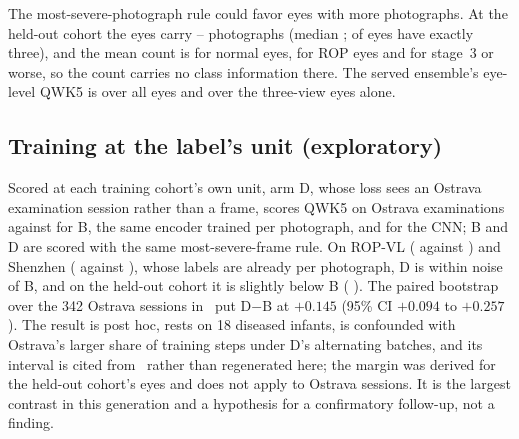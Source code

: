 \documentclass[journal]{IEEEtran}
\begin{document}
The most-severe-photograph rule could favor eyes with more photographs. At the held-out cohort the eyes carry \devPhotosPerEyeMin{}--\devPhotosPerEyeMax{} photographs (median \devPhotosPerEyeMedian{}; \devEyesThreeViews{} of \devEyes{} eyes have exactly three), and the mean count is \devPhotosNormalMean{} for normal eyes, \devPhotosDiseasedMean{} for ROP eyes and \devPhotosSevereMean{} for stage~3 or worse, so the count carries no class information there. The served ensemble's eye-level QWK5 is \BdevQens{} \BdevQensci{} over all eyes and \BdevQthree{} \BdevQthreeci{} over the three-view eyes alone.

\begin{table}[!t]
\caption{Operating point and calibration, per arm and seed. Threshold: the largest any-ROP score keeping cross-validation (CV) unit-level sensitivity $\ge 0.90$; carried unchanged to the held-out cohort's development half (dev), where sensitivity and specificity are means over the seed's five fold models. Severe: stage \nSevereFrom{} or worse, including AP-ROP. $T$: temperature fitted on CV out-of-fold unit vectors. ECE: expected calibration error, ten bins, dev eyes, seeds pooled, as trained and after $T$.}
\label{tab:operating}
\centering\scriptsize\setlength{\tabcolsep}{2.4pt}

\end{table}

\subsection{Training at the label's unit (exploratory)}
Scored at each training cohort's own unit, arm D, whose loss sees an Ostrava examination session rather than a frame, scores QWK5 \DostravaQ{} \DostravaQci{} on Ostrava examinations against \BostravaQ{} \BostravaQci{} for B, the same encoder trained per photograph, and \CostravaQ{} \CostravaQci{} for the CNN; B and D are scored with the same most-severe-frame rule. On ROP-VL (\DropvlQ{} against \BropvlQ{}) and Shenzhen (\DshenzhenQ{} against \BshenzhenQ{}), whose labels are already per photograph, D is within noise of B, and on the held-out cohort it is slightly below B (\devDiffDB{} \devDiffDBci{}). The paired bootstrap over the 342 Ostrava sessions in~\cite{nagpure2026} put D$-$B at $+0.145$ (95\% CI $+0.094$ to $+0.257$). The result is post hoc, rests on 18 diseased infants, is confounded with Ostrava's larger share of training steps under D's alternating batches, and its interval is cited from~\cite{nagpure2026} rather than regenerated here; the \mdd{} margin was derived for the held-out cohort's eyes and does not apply to Ostrava sessions. It is the largest contrast in this generation and a hypothesis for a confirmatory follow-up, not a finding.
\end{document}
